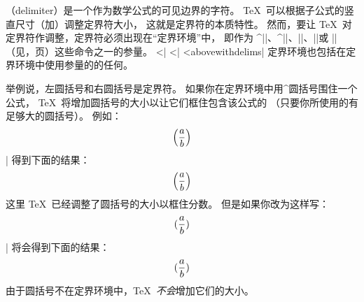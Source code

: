 {%
（delimiter）是一个作为数学公式的可见边界的字符。
\TeX\ 可以根据子公式的竖直尺寸（加）调整定界符大小，
这就是定界符的本质特性。
然而，要让 \TeX\ 对定界符作调整，定界符必须出现在“定界环境”中，
即作为 ^|\left|、^|\right|、|\overwithdelims|、|\atopwithdelims|或 |\abovewithdelims|%
（见\xrefn{\overwithdelims}，\xrefn{\left}页）这些命令之一的参量。
^^|\overwithdelims|
^^|\atopwithdelims|
^^|abovewithdelims|
定界环境也包括在定界环境中使用参量的的任何。

举例说，左圆括号和右圆括号是定界符。
如果你在定界环境中用^{圆括号}围住一个公式，
\TeX\ 将增加圆括号的大小以让它们框住包含该公式的%
（只要你所使用的有足够大的圆括号）。
例如：
\csdisplay
$$ \left( a \over b \right) $$
|
得到下面的结果：
\centereddisplays $$\left (a \over b \right ) $$
这里 \TeX\ 已经调整了圆括号的大小以框住分数。
但是如果你改为这样写：
\csdisplay
$$({a \over b})$$
|
将会得到下面的结果：
$$({a \over b})$$
由于圆括号不在定界环境中，\TeX\ \emph{不会}增加它们的大小。

}
